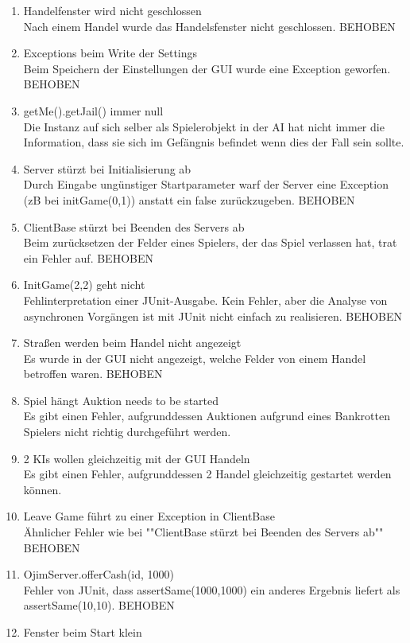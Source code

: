 \documentclass[a4paper,10pt]{article}
\begin{document}
\begin{enumerate}
\item Handelfenster wird nicht geschlossen
\\Nach einem Handel wurde das Handelsfenster nicht geschlossen. BEHOBEN
\item Exceptions beim Write der Settings
\\Beim Speichern der Einstellungen der GUI wurde eine Exception geworfen. BEHOBEN
\item getMe().getJail() immer null
\\Die Instanz auf sich selber als Spielerobjekt in der AI hat nicht immer die Information, dass sie sich im Gefängnis befindet wenn dies der Fall sein sollte.
\item Server stürzt bei Initialisierung ab
\\Durch Eingabe ungünstiger Startparameter warf der Server eine Exception (zB bei initGame(0,1)) anstatt ein false zurückzugeben. BEHOBEN
\item ClientBase stürzt bei Beenden des Servers ab
\\Beim zurücksetzen der Felder eines Spielers, der das Spiel verlassen hat, trat ein Fehler auf. BEHOBEN
\item InitGame(2,2) geht nicht
\\Fehlinterpretation einer JUnit-Ausgabe. Kein Fehler, aber die Analyse von asynchronen Vorgängen ist mit JUnit nicht einfach zu realisieren. BEHOBEN
\item Straßen werden beim Handel nicht angezeigt
\\Es wurde in der GUI nicht angezeigt, welche Felder von einem Handel betroffen waren. BEHOBEN
\item Spiel hängt Auktion needs to be started
\\Es gibt einen Fehler, aufgrunddessen Auktionen aufgrund eines Bankrotten Spielers nicht richtig durchgeführt werden.
\item 2 KIs wollen gleichzeitig mit der GUI Handeln
\\Es gibt einen Fehler, aufgrunddessen 2 Handel gleichzeitig gestartet werden können.
\item Leave Game führt zu einer Exception in ClientBase
\\Ähnlicher Fehler wie bei ""ClientBase stürzt bei Beenden des Servers ab"" BEHOBEN
\item OjimServer.offerCash(id, 1000)
\\Fehler von JUnit, dass assertSame(1000,1000) ein anderes Ergebnis liefert als assertSame(10,10). BEHOBEN
\item Fenster beim Start klein

\end{enumerate}
\end{document}
